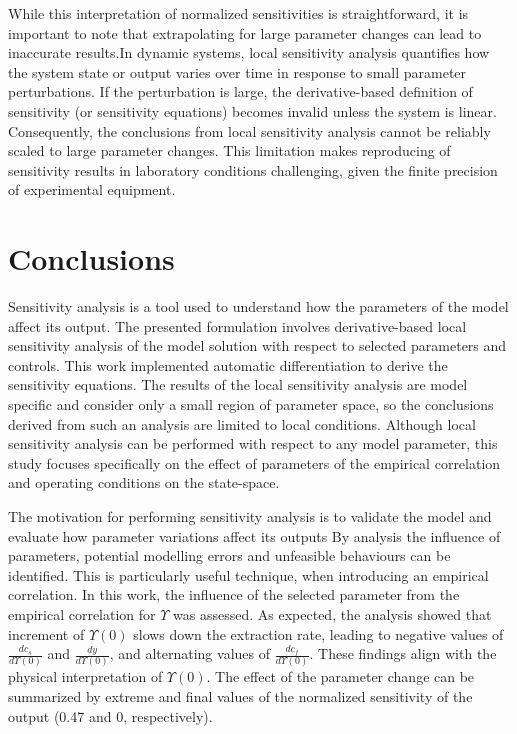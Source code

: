 \documentclass[a4paper,fleqn]{cas-dc}
\begin{document}
	While this interpretation of normalized sensitivities is straightforward, it is important to note that extrapolating for large parameter changes can lead to inaccurate results.In dynamic systems, local sensitivity analysis quantifies how the system state or output varies over time in response to small parameter perturbations. If the perturbation is large, the derivative-based definition of sensitivity (or sensitivity equations) becomes invalid unless the system is linear. Consequently, the conclusions from local sensitivity analysis cannot be reliably scaled to large parameter changes. This limitation makes reproducing of sensitivity results in laboratory conditions challenging, given the finite precision of experimental equipment.
	
	\section{Conclusions} \label{CH: Conclusion}
	
	Sensitivity analysis is a tool used to understand how the parameters of the model affect its output. The presented formulation involves derivative-based local sensitivity analysis of the model solution with respect to selected parameters and controls. This work implemented automatic differentiation to derive the sensitivity equations. The results of the local sensitivity analysis are model specific and consider only a small region of parameter space, so the conclusions derived from such an analysis are limited to local conditions. Although local sensitivity analysis can be performed with respect to any model parameter, this study focuses specifically on the effect of parameters of the empirical correlation and operating conditions on the state-space.
	
	{\color{blue}The motivation for performing sensitivity analysis is to validate the model and evaluate how parameter variations affect its outputs By analysis the influence of parameters, potential modelling errors and unfeasible behaviours can be identified. This is particularly useful technique, when introducing an empirical correlation. In this work, the influence of the selected parameter from the empirical correlation for $\Upsilon$ was assessed. As expected, the analysis showed that increment of $\Upsilon(0)$ slows down the extraction rate, leading to negative values of $\frac{dc_s}{d\Upsilon(0)}$ and $\frac{dy}{d\Upsilon(0)}$, and alternating values of $\frac{dc_f}{d\Upsilon(0)}$. These findings align with the physical interpretation of $\Upsilon(0)$. The effect of the parameter change can be summarized by extreme and final values of the normalized sensitivity of the output (0.47 and 0, respectively).}
	
\end{document}
